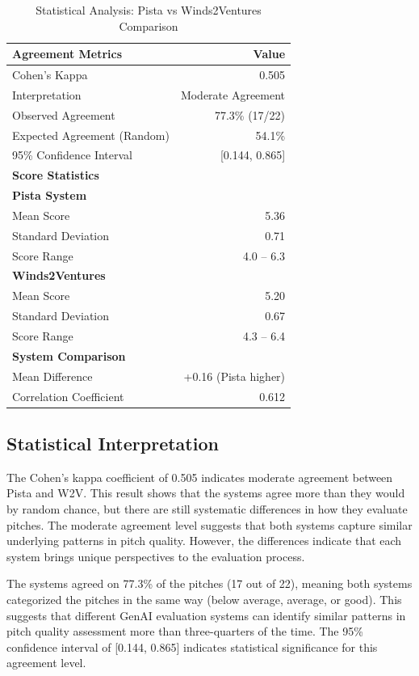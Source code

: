 \begin{table}[h]
\centering
\caption{Statistical Analysis: Pista vs Winds2Ventures Comparison}
\label{tab:comprehensive-results}
\begin{tabular}{lr}
\hline
\textbf{Agreement Metrics} & \textbf{Value} \\
\hline
Cohen's Kappa & 0.505 \\
Interpretation & Moderate Agreement \\
Observed Agreement & 77.3\% (17/22) \\
Expected Agreement (Random) & 54.1\% \\
95\% Confidence Interval & [0.144, 0.865] \\
\hline
\textbf{Score Statistics} & \\
\hline
\textbf{Pista System} & \\
Mean Score & 5.36 \\
Standard Deviation & 0.71 \\
Score Range & 4.0 -- 6.3 \\
\hline
\textbf{Winds2Ventures} & \\
Mean Score & 5.20 \\
Standard Deviation & 0.67 \\
Score Range & 4.3 -- 6.4 \\
\hline
\textbf{System Comparison} & \\
Mean Difference & +0.16 (Pista higher) \\
Correlation Coefficient & 0.612 \\
\hline
\end{tabular}
\end{table}

\clearpage
\subsection{Statistical Interpretation}

The Cohen's kappa coefficient of 0.505 indicates moderate agreement between Pista and W2V. This result shows that the systems agree more than they would by random chance, but there are still systematic differences in how they evaluate pitches. The moderate agreement level suggests that both systems capture similar underlying patterns in pitch quality. However, the differences indicate that each system brings unique perspectives to the evaluation process.

The systems agreed on 77.3\% of the pitches (17 out of 22), meaning both systems categorized the pitches in the same way (below average, average, or good). This suggests that different GenAI evaluation systems can identify similar patterns in pitch quality assessment more than three-quarters of the time. The 95\% confidence interval of [0.144, 0.865] indicates statistical significance for this agreement level.

